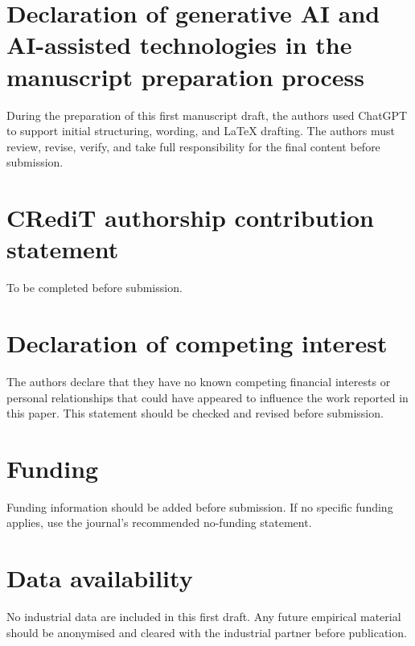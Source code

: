 \documentclass[preprint,12pt]{elsarticle}
\begin{document}









\section*{Declaration of generative AI and AI-assisted technologies in the manuscript preparation process}
During the preparation of this first manuscript draft, the authors used ChatGPT to support initial structuring, wording, and LaTeX drafting. The authors must review, revise, verify, and take full responsibility for the final content before submission.

\section*{CRediT authorship contribution statement}
To be completed before submission.

\section*{Declaration of competing interest}
The authors declare that they have no known competing financial interests or personal relationships that could have appeared to influence the work reported in this paper. This statement should be checked and revised before submission.

\section*{Funding}
Funding information should be added before submission. If no specific funding applies, use the journal's recommended no-funding statement.

\section*{Data availability}
No industrial data are included in this first draft. Any future empirical material should be anonymised and cleared with the industrial partner before publication.



\end{document}
